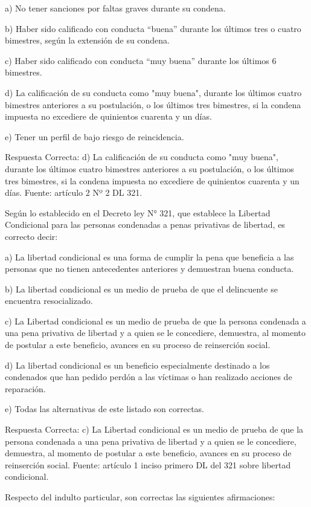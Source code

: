 \documentclass[letterpaper, 11pt]{article}
\begin{document}
a) No tener sanciones por faltas graves durante su condena.

b) Haber sido calificado con conducta “buena” durante los últimos tres o cuatro bimestres,
según la extensión de su condena.

c) Haber sido calificado con conducta “muy buena” durante los últimos 6 bimestres.

d) La calificación de su conducta como "muy buena", durante los últimos cuatro bimestres
anteriores a su postulación, o los últimos tres bimestres, si la condena impuesta no
excediere de quinientos cuarenta y un días.

e) Tener un perfil de bajo riesgo de reincidencia.

Respuesta Correcta:
d) La calificación de su conducta como "muy buena", durante los
últimos cuatro bimestres anteriores a su postulación, o los últimos tres bimestres, si la
condena impuesta no excediere de quinientos cuarenta y un días.
Fuente: artículo 2 Nº 2 DL 321.

Según lo establecido en el Decreto ley N° 321, que establece la Libertad Condicional
para las personas condenadas a penas privativas de libertad, es correcto decir:

a) La libertad condicional es una forma de cumplir la pena que beneficia a las personas que
no tienen antecedentes anteriores y demuestran buena conducta.

b) La libertad condicional es un medio de prueba de que el delincuente se encuentra
resocializado.

c) La Libertad condicional es un medio de prueba de que la persona condenada a una pena
privativa de libertad y a quien se le concediere, demuestra, al momento de postular a este
beneficio, avances en su proceso de reinserción social.

d) La libertad condicional es un beneficio especialmente destinado a los condenados que
han pedido perdón a las víctimas o han realizado acciones de reparación.

e) Todas las alternativas de este listado son correctas.

Respuesta Correcta:
c) La Libertad condicional es un medio de prueba de que la persona
condenada a una pena privativa de libertad y a quien se le concediere, demuestra, al
momento de postular a este beneficio, avances en su proceso de reinserción social.
Fuente: artículo 1 inciso primero DL del 321 sobre libertad condicional.

Respecto del indulto particular, son correctas las siguientes afirmaciones:
\end{document}
